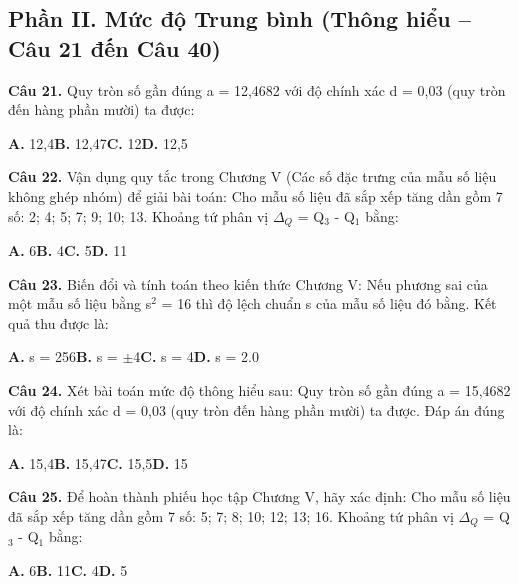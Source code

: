 \documentclass[11pt,a4paper]{article}
\begin{document}
\subsection*{\color{accent} Phần II. Mức độ Trung bình (Thông hiểu -- Câu 21 đến Câu 40)}
\textbf{\color{primary} Câu 21.} Quy tròn số gần đúng a = 12,4682 với độ chính xác d = 0,03 (quy tròn đến hàng phần mười) ta được:\par
\hspace*{1.5em}\textbf{A.} 12,4\quad\quad \textbf{B.} 12,47\quad\quad \textbf{C.} 12\quad\quad \textbf{D.} 12,5\par\vspace{2pt}
\textbf{\color{primary} Câu 22.} Vận dụng quy tắc trong Chương V (Các số đặc trưng của mẫu số liệu không ghép nhóm) để giải bài toán: Cho mẫu số liệu đã sắp xếp tăng dần gồm 7 số: 2; 4; 5; 7; 9; 10; 13. Khoảng tứ phân vị $\Delta_Q$ = Q$_3$ - Q$_1$ bằng:\par
\hspace*{1.5em}\textbf{A.} 6\quad\quad \textbf{B.} 4\quad\quad \textbf{C.} 5\quad\quad \textbf{D.} 11\par\vspace{2pt}
\textbf{\color{primary} Câu 23.} Biến đổi và tính toán theo kiến thức Chương V: Nếu phương sai của một mẫu số liệu bằng s$^2$ = 16 thì độ lệch chuẩn s của mẫu số liệu đó bằng. Kết quả thu được là:\par
\hspace*{1.5em}\textbf{A.} s = 256\quad\quad \textbf{B.} s = $\pm$4\quad\quad \textbf{C.} s = 4\quad\quad \textbf{D.} s = 2.0\par\vspace{2pt}
\textbf{\color{primary} Câu 24.} Xét bài toán mức độ thông hiểu sau: Quy tròn số gần đúng a = 15,4682 với độ chính xác d = 0,03 (quy tròn đến hàng phần mười) ta được. Đáp án đúng là:\par
\hspace*{1.5em}\textbf{A.} 15,4\quad\quad \textbf{B.} 15,47\quad\quad \textbf{C.} 15,5\quad\quad \textbf{D.} 15\par\vspace{2pt}
\textbf{\color{primary} Câu 25.} Để hoàn thành phiếu học tập Chương V, hãy xác định: Cho mẫu số liệu đã sắp xếp tăng dần gồm 7 số: 5; 7; 8; 10; 12; 13; 16. Khoảng tứ phân vị $\Delta_Q$ = Q$_3$ - Q$_1$ bằng:\par
\hspace*{1.5em}\textbf{A.} 6\quad\quad \textbf{B.} 11\quad\quad \textbf{C.} 4\quad\quad \textbf{D.} 5\par\vspace{2pt}
\end{document}
